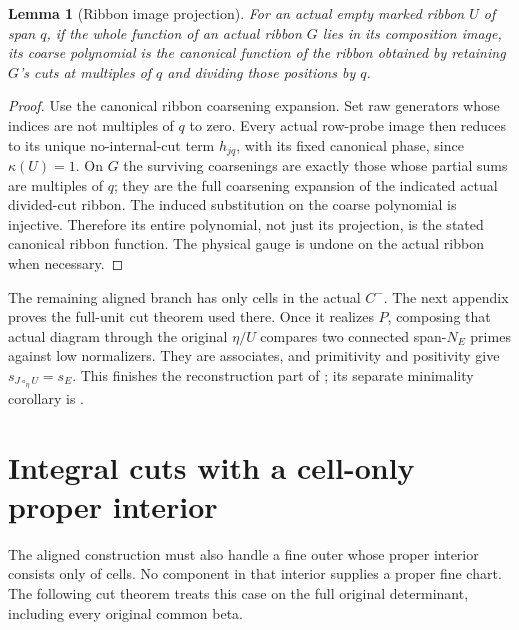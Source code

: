 \documentclass[11pt,a4paper]{amsart}
\numberwithin{equation}{section}
\theoremstyle{plain}
\newtheorem{lemma}[theorem]{Lemma}
\theoremstyle{definition}
\begin{document}
\begin{lemma}[Ribbon image projection]\label{lem:ribbon-image}
For an actual empty marked ribbon \(U\) of span \(q\), if the whole function
of an actual ribbon \(G\) lies in its composition image, its coarse
polynomial is the canonical function of the ribbon obtained by retaining
\(G\)'s cuts at multiples of \(q\) and dividing those positions by \(q\).
\end{lemma}
\begin{proof}
Use the canonical ribbon coarsening expansion.  Set raw generators whose
indices are not multiples of \(q\) to zero.  Every actual row-probe image
then reduces to its unique no-internal-cut term \(h_{jq}\), with its fixed
canonical phase, since \(\kappa(U)=1\).  On \(G\) the surviving coarsenings
are exactly those whose partial sums are multiples of \(q\); they are the
full coarsening expansion of the indicated actual divided-cut ribbon.
The induced substitution on the coarse polynomial is injective.
Therefore its entire polynomial, not just its projection, is the stated
canonical ribbon function.  The physical gauge is undone on the actual
ribbon when necessary.
\end{proof}

The remaining aligned branch has only cells in the actual \(C^-\).
The next appendix proves the full-unit cut theorem used there.  Once it
realizes \(P\), composing that actual diagram through the original \(\eta/U\)
compares two connected span-\(N_E\) primes against low normalizers.
They are associates, and primitivity and positivity give
\(s_{J\circ_\eta U}=s_E\).  This finishes the reconstruction part of
; its separate minimality corollary is
.


\section{Integral cuts with a cell-only proper interior}\label{app:cell-cut}

The aligned construction must also handle a fine outer whose proper
interior consists only of cells.  No component in that interior supplies a
proper fine chart.  The following cut theorem treats this case on the full
original determinant, including every original common beta.
\end{document}

